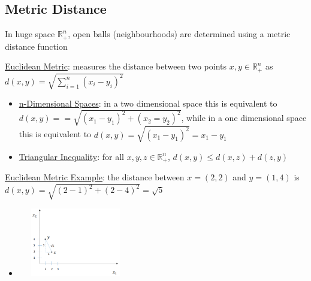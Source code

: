 \documentclass{article}
\begin{document}
\subsection{Metric Distance}
In huge space $\mathbb{R}_{+}^{n}$, open balls (neighbourhoods) are determined using a metric distance function \par \vspace{0.3em}
  \underline{Euclidean Metric}: measures the distance between two points $x, y \in \mathbb{R}_{+}^{n}$ as $d(x,y) = \sqrt{\sum_{i=1}^{n}(x_{i}-y_{i})^{2}}$
  \begin{itemize}
    \item  \underline{n-Dimensional Spaces}: in a two dimensional space this is equivalent to $d(x,y) == \sqrt{(x_{1} - y_{1})^{2} + (x_{2} = y_{2})^{2}}$, while in a one dimensional space this is equivalent to $d(x,y) = \sqrt{(x_{1} - y_{1})^{2}} = x_{1} - y_{1}$
    \item  \underline{Triangular Inequality}: for all $x, y, z \in \mathbb{R}_{+}^{n}$, $d(x,y) \leq d(x,z) + d(z,y)$
  \end{itemize}
  \par
  \underline{Euclidean Metric Example}: the distance between $x = (2,2)$ and $y = (1,4)$ is $d(x,y) = \sqrt{(2-1)^{2} + (2-4)^{2}} = \sqrt{5}$
  \begin{itemize}
    \item  \includegraphics[width=5cm, height=3cm]{pic1}
  \end{itemize}
  \par
\vspace{6mm}
\end{document}
